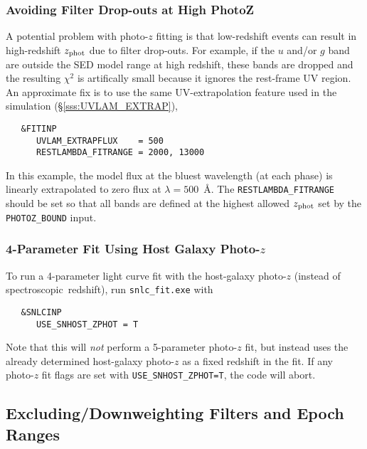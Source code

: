 \documentclass[12pt]{article}
\newcommand{\Zphot}{z_{\rm phot}}
\newcommand{\spec}{spectroscopic}
\newcommand{\lam}{\lambda}
\begin{document}
   \subsubsection{Avoiding Filter Drop-outs at High PhotoZ}
   \label{sss:avoid_filter_dropouts}

A potential problem with photo-$z$ fitting is that low-redshift events
can result in high-redshift $\Zphot$ due to filter drop-outs.
For example, if the $u$ and/or $g$ band are outside the SED model 
range at high redshift, these bands are dropped and the resulting 
$\chi^2$ is artifically small because it ignores the rest-frame UV region.
An approximate fix is to use the same UV-extrapolation feature used
in the simulation (\S\ref{sss:UVLAM_EXTRAP}),
\begin{verbatim}
   &FITINP
      UVLAM_EXTRAPFLUX    = 500          
      RESTLAMBDA_FITRANGE = 2000, 13000 
\end{verbatim}
In this example, the model flux at the bluest wavelength (at each phase)
is  linearly extrapolated to zero flux at $\lam=500$~\AA.
The {\tt RESTLAMBDA\_FITRANGE} should be set so that all bands
are defined at the highest allowed $\Zphot$ set by the
{\tt PHOTOZ\_BOUND} input.


   \subsubsection{4-Parameter Fit Using Host Galaxy Photo-$z$ }
   \label{sss:zphot_host}

To run a 4-parameter light curve fit with the host-galaxy photo-$z$
(instead of \spec\ redshift), run {\tt snlc\_fit.exe} with
\begin{verbatim}
   &SNLCINP
      USE_SNHOST_ZPHOT = T
\end{verbatim}
Note that this will {\it not} perform a 5-parameter photo-$z$ fit, 
but instead uses the already determined host-galaxy photo-$z$
as a fixed redshift in the fit. If any photo-$z$ fit flags are set
with {\tt USE\_SNHOST\_ZPHOT=T}, the code will abort.

   \clearpage
   \subsection{Excluding/Downweighting Filters and Epoch Ranges}
   \label{subsec:fitexclude}
\end{document}
